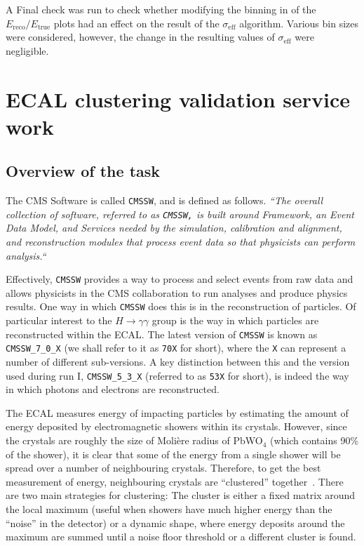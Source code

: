 \documentclass[10pt]{article}
\begin{document}
A Final check was run to check whether modifying the binning in of the $E_{\text{reco}}/E_{\text{true}}$ plots had an effect on the result of the $\sigma_{\text{eff}}$ algorithm. Various bin sizes were considered, however, the change in the resulting values of $\sigma_{\text{eff}}$ were negligible.

\section{ECAL clustering validation service work}
\subsection{Overview of the task}

The CMS Software is called \texttt{CMSSW}, and is defined as follows. \textit{``The overall collection of software, referred to as \texttt{CMSSW,} is built around Framework, an Event Data Model, and Services needed by the simulation, calibration and alignment, and reconstruction modules that process event data so that physicists can perform analysis.``}~\cite{CMSSW}

Effectively, \texttt{CMSSW} provides a way to process and select events from raw data and allows physicists in the CMS collaboration to run analyses and produce physics results. One way in which \texttt{CMSSW} does this is in the reconstruction of particles. Of particular interest to the $H \rightarrow \gamma \gamma$ group is the way in which particles are reconstructed within the ECAL. The latest version of \texttt{CMSSW} is known as \texttt{CMSSW\_7\_0\_X} (we shall refer to it as \texttt{70X} for short), where the \texttt{X} can represent a number of different sub-versions. A key distinction between this and the version used during run I, \texttt{CMSSW\_5\_3\_X} (referred to as \texttt{53X} for short), is indeed the way in which photons and electrons are reconstructed. 

The ECAL measures energy of impacting particles by estimating the amount of energy deposited by electromagnetic showers within its crystals. However, since the crystals are roughly the size of Molière radius of PbWO$_4$ (which contains 90\% of the shower), it is clear that some of the energy from a single shower will be spread over a number of neighbouring crystals. Therefore, to get the best measurement of energy, neighbouring crystals are ``clustered'' together~\cite{ecalShower}. There are two main strategies for clustering: The cluster is either a fixed matrix around the local maximum  (useful when showers have much higher energy than the ``noise'' in the detector) or a dynamic shape, where energy deposits around the maximum are summed until a noise floor threshold or a different cluster is found. 
\end{document}
